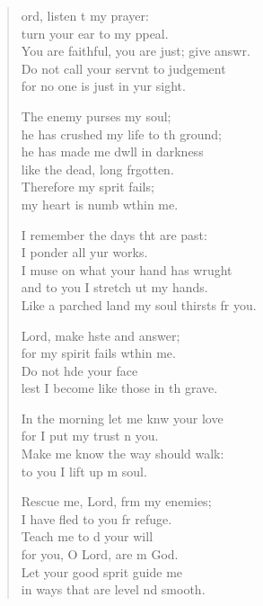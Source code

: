 \begin{verse}
  \begin{patverse}
    ord, listen t my prayer:\Med\\
    turn your ear to my ppeal.\\
    You are faithful, you are just; give answr.\Flex\\
    Do not call your servnt to judgement\\
    for no one is just in yur sight.

    The enemy purses my soul;\Med\\
    he has crushed my life to th ground;\\
    he has made me dwll in darkness\Med\\
    like the dead, long frgotten.\\
    Therefore my sp\pointup{\i}rit fails;\Med\\
    my heart is numb w\pointup{\i}thin me.

    I remember the days tht are past:\Med\\
    I ponder all yur works.\\
    I muse on what your hand has wrught\Flex\\
    and to you I stretch ut my hands.\Med\\
    Like a parched land my soul thirsts fr you.

    Lord, make hste and answer;\Med\\
    for my spirit fails w\pointup{\i}thin me.\\
    Do not h\pointup{\i}de your face\Med\\
    lest I become like those in th grave.

    In the morning let me knw your love\Med\\
    for I put my trust \pointup{\i}n you.\\
    Make me know the way  should walk:\Med\\
    to you I lift up m soul.

    Rescue me, Lord, frm my enemies;\Med\\
    I have fled to you fr refuge.\\
    Teach me to d your will\Med\\
    for you, O Lord, are m God.\\
    Let your good sp\pointup{\i}rit guide me\Med\\
    in ways that are level nd smooth.


\end{patverse}
\end{verse}
